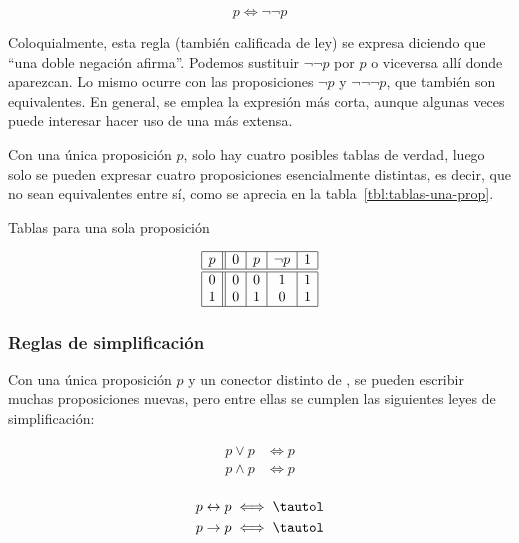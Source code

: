 $$ p \iff \neg \neg p $$

Coloquialmente, esta regla (también calificada de ley) se expresa diciendo
que ``una doble negación afirma''. Podemos sustituir $\neg \neg p$ por $p$ o
viceversa allí donde aparezcan. Lo mismo ocurre con las proposiciones $\neg
p$ y $\neg \neg \neg p$, que también son equivalentes. En general, se emplea
la expresión más corta, aunque algunas veces puede interesar hacer uso de
una más extensa.

Con una única proposición $p$, solo hay cuatro posibles tablas de verdad,
luego solo se pueden expresar cuatro proposiciones esencialmente distintas,
es decir, que no sean equivalentes entre sí, como se aprecia en la
tabla~\ref{tbl:tablas-una-prop}.

\begin{table}[h]%
  \caption{Tablas para una sola proposición}
  \label{tbl:tablas-una-prop}%
  \centering
  $$
    \begin{array}{|c||c|c|c|c|}
      \hline
      p & 0 & p & \neg p & 1 \\
      \hline
      \hline
      0 & 0 & 0 & 1 & 1 \\
      1 & 0 & 1 & 0 & 1 \\
      \hline
    \end{array}
  $$
\end{table}






\subsubsection{Reglas de simplificación}

Con una única proposición $p$ y un conector distinto de \neg, se pueden
escribir muchas proposiciones nuevas, pero entre ellas se cumplen las
siguientes leyes de simplificación:

\begin{minipage}[t]{.45\textwidth}
  \centering
  \begin{align*}
    p \lor p &\iff p \\
    p \land p &\iff p \\
  \end{align*}
\end{minipage}
\begin{minipage}[t]{.45\textwidth}
  \centering
  \begin{align*}
    p \leftrightarrow p &\iff \tautol \\
    p \rightarrow p &\iff \tautol \\
  \end{align*}
\end{minipage}

